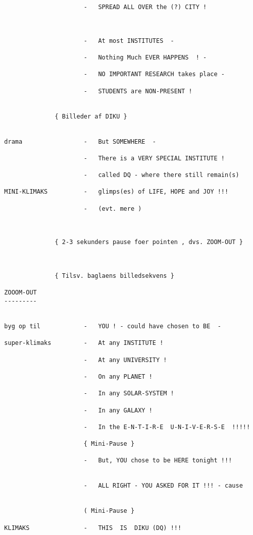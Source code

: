 \documentclass[a4paper,11pt]{article}
\begin{document}
\begin{sketch}
\begin{verbatim}
                        -   SPREAD ALL OVER the (?) CITY !



                        -   At most INSTITUTES  -  

                        -   Nothing Much EVER HAPPENS  ! -

                        -   NO IMPORTANT RESEARCH takes place -

                        -   STUDENTS are NON-PRESENT !


                { Billeder af DIKU }


  drama                 -   But SOMEWHERE  -

                        -   There is a VERY SPECIAL INSTITUTE !

                        -   called DQ - where there still remain(s)

  MINI-KLIMAKS          -   glimps(es) of LIFE, HOPE and JOY !!!

                        -   (evt. mere )



                { 2-3 sekunders pause foer pointen , dvs. ZOOM-OUT }



                { Tilsv. baglaens billedsekvens } 

  ZOOOM-OUT
  ---------


  byg op til            -   YOU ! - could have chosen to BE  -
 
  super-klimaks         -   At any INSTITUTE !

                        -   At any UNIVERSITY !

                        -   On any PLANET !

                        -   In any SOLAR-SYSTEM !

                        -   In any GALAXY !

                        -   In the E-N-T-I-R-E  U-N-I-V-E-R-S-E  !!!!!

                        { Mini-Pause }
                
                        -   But, YOU chose to be HERE tonight !!!


                        -   ALL RIGHT - YOU ASKED FOR IT !!! - cause 


                        ( Mini-Pause }

  KLIMAKS               -   THIS  IS  DIKU (DQ) !!!



\end{verbatim}
\end{sketch}
\end{document}
